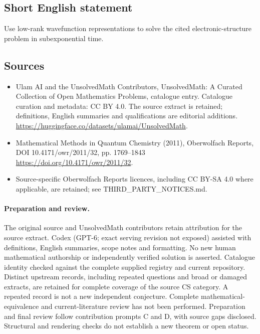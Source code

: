 \documentclass[11pt]{article}
\begin{document}
\subsection{Short English statement}
Use low-rank wavefunction representations to solve the cited electronic-structure problem in subexponential time.
\subsection{Sources}
\begin{itemize}
\item[\hypertarget{source:statement:1}{S1}] Ulam AI and the UnsolvedMath Contributors, UnsolvedMath: A Curated Collection of Open Mathematics Problems, catalogue entry. Catalogue curation and metadata: CC BY 4.0. The source extract is retained; definitions, English summaries and qualifications are editorial additions.
\url{https://huggingface.co/datasets/ulamai/UnsolvedMath}.
\item[\hypertarget{source:statement:2}{S2}] Mathematical Methods in Quantum Chemistry (2011), Oberwolfach Reports, DOI 10.4171/owr/2011/32, pp. 1769--1843
\url{https://doi.org/10.4171/owr/2011/32}.
\item Source-specific Oberwolfach Reports licences, including CC BY-SA 4.0 where applicable, are retained; see THIRD\_PARTY\_NOTICES.md.
\end{itemize}
\paragraph{Preparation and review.}
The original source and UnsolvedMath contributors retain attribution for the source extract. Codex (GPT-6; exact serving revision not exposed) assisted with definitions, English summaries, scope notes and formatting. No new human mathematical authorship or independently verified solution is asserted. Catalogue identity checked against the complete supplied registry and current repository. Distinct upstream records, including repeated questions and broad or damaged extracts, are retained for complete coverage of the source CS category. A repeated record is not a new independent conjecture. Complete mathematical-equivalence and current-literature review has not been performed. Preparation and final review follow contribution prompts C and D, with source gaps disclosed. Structural and rendering checks do not establish a new theorem or open status.
\label{end:statement}
\end{document}
